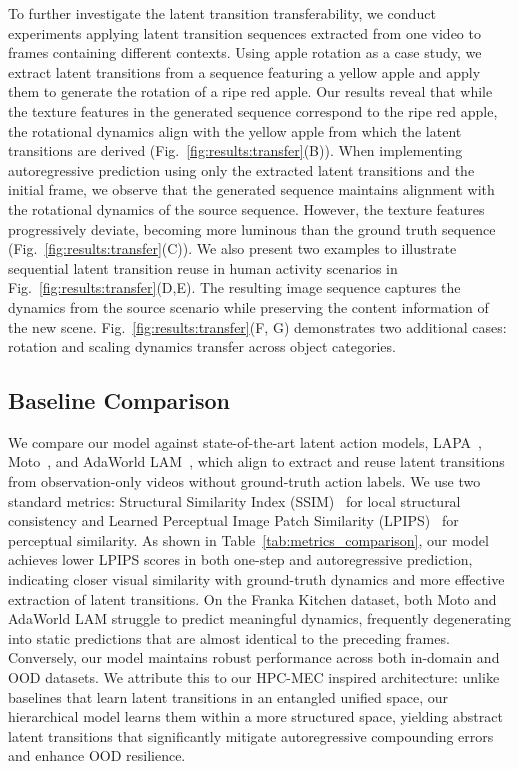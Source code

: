 To further investigate the latent transition transferability, we conduct experiments applying latent transition sequences extracted from one video to frames containing different contexts. Using apple rotation as a case study, we extract latent transitions from a sequence featuring a yellow apple and apply them to generate the rotation of a ripe red apple. Our results reveal that while the texture features in the generated sequence correspond to the ripe red apple, the rotational dynamics align with the yellow apple from which the latent transitions are derived (Fig.~\ref{fig:results:transfer}(B)).
When implementing autoregressive prediction using only the extracted latent transitions and the initial frame, we observe that the generated sequence maintains alignment with the rotational dynamics of the source sequence. However, the texture features progressively deviate, becoming more luminous than the ground truth sequence (Fig.~\ref{fig:results:transfer}(C)). 
We also present two examples to illustrate sequential latent transition reuse in human activity scenarios in Fig.~\ref{fig:results:transfer}(D,E). The resulting image sequence captures the dynamics from the source scenario while preserving the content information of the new scene.
Fig.~\ref{fig:results:transfer}(F, G) demonstrates two additional cases: rotation and scaling dynamics transfer across object categories.

\vspace{-0.2cm}
\subsection{Baseline Comparison}
\label{sec:results:baseline}
We compare our model against state-of-the-art latent action models, LAPA~\citep{yeLatentActionPretraining2024}, Moto~\citep{chenMotoLatentMotion2024}, and AdaWorld LAM~\citep{gaoAdaWorldLearningAdaptable2025b}, which align to extract and reuse latent transitions from observation-only videos without ground-truth action labels.
We use two standard metrics: Structural Similarity Index (SSIM)~\citep{wang2004image} for local structural consistency and Learned Perceptual Image Patch Similarity (LPIPS)~\citep{zhang2018unreasonable} for perceptual similarity. As shown in Table~\ref{tab:metrics_comparison}, our model achieves lower LPIPS scores in both one-step and autoregressive prediction, indicating closer visual similarity with ground-truth dynamics and more effective extraction of latent transitions. 
On the Franka Kitchen dataset, both Moto and AdaWorld LAM struggle to predict meaningful dynamics, frequently degenerating into static predictions that are almost identical to the preceding frames. Conversely, our model maintains robust performance across both in-domain and OOD datasets.
We attribute this to our HPC-MEC inspired architecture: unlike baselines that learn latent transitions in an entangled unified space, our hierarchical model learns them within a more structured space, yielding abstract latent transitions that significantly mitigate autoregressive compounding errors and enhance OOD resilience.
\vspace{-0.2cm}


